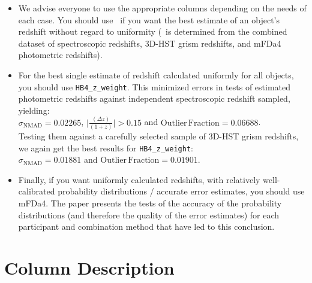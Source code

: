 \begin{itemize}
\item We advise everyone to use the appropriate columns depending on the needs of each case. You should use \zbest\ if you want the best estimate of an object's redshift without regard to uniformity (\zbest\ is determined from the combined dataset of spectroscopic redshifts, 3D-HST grism redshifts, and mFDa4 photometric redshifts).

\item For the best single estimate of redshift calculated uniformly for all objects, you should use \texttt{HB4\_z\_weight}.  This minimized errors in tests of estimated photometric redshifts against independent spectroscopic redshift sampled, yielding:\\
\-\hspace{1cm} $\sigma_\mathrm{NMAD} = 0.02265$, $\lvert \frac{(\Delta z)}{(1+z)} \rvert > 0.15$ and $\mathrm{Outlier \, Fraction} = 0.06688$.\\
Testing them against a carefully selected sample of 3D-HST grism redshifts, we again get the best results for \texttt{HB4\_z\_weight}:\\
\-\hspace{1cm} $\sigma_\mathrm{NMAD} = 0.01881$ and $\mathrm{Outlier \, Fraction} = 0.01901$.

\item Finally, if you want uniformly calculated redshifts, with relatively well-calibrated probability distributions / accurate error estimates, you should use mFDa4.  The paper presents the tests of the accuracy of the probability distributions (and therefore the quality of the error estimates) for each participant and combination method that have led to this conclusion.

\end{itemize}


\section*{Column Description}


